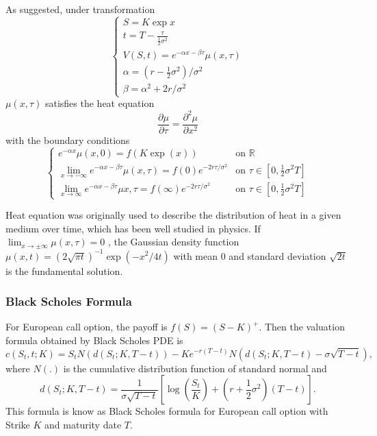 \documentclass[11pt]{book}
\def\bR{{\mathbb{R}}}
\begin{document}
As suggested, under transformation
\begin{equation}
\begin{cases}
S=K\exp{x} \\
t=T-\frac{\tau}{\frac{1}{2}\sigma ^2} \\
V(S,t)=e^{-\alpha x - \beta \tau } \mu(x, \tau)\\
\alpha=(r-\frac{1}{2} \sigma ^2) / \sigma ^2 \\
\beta= \alpha ^2 + 2r/{\sigma}^2
\end{cases}
\end{equation}
$\mu(x,\tau)$ satisfies the heat equation
\begin{equation}
\frac{\partial \mu}{\partial \tau} = \frac{\partial ^2 \mu}{\partial x^2}
\end{equation}
with the boundary conditions
\begin{equation}
\begin{cases}
e^{-\alpha x} \mu (x,0) = f(K \exp(x)) & \text{on } \bR \\
\displaystyle \lim_{x \to -\infty}e^{-\alpha x- \beta \tau } \mu(x,\tau) = f(0)e^{-2r\tau / \sigma ^2} &\text{on } \tau \in [0,\frac{1}{2}\sigma ^2 T] \\
\displaystyle \lim_{x \to \infty} e^{-\alpha x -\beta \tau } \mu{x,\tau}  = f(\infty) e^{-2r\tau / \sigma ^2} & \text{on } \tau \in [0, \frac{1}{2} \sigma ^2 T]
\end{cases}
\end{equation}

Heat equation was originally used to describe the distribution of heat in a given medium over time, which has been well studied in physics. If $\lim_{x\to \pm \infty} \mu (x, \tau)= 0$ , the Gaussian density function $\mu (x,t) = (2 \sqrt{\pi t} )^{-1} \exp(-x^2 /{4t})$ with mean $0$ and standard deviation $\sqrt {2t} $ is the fundamental solution.

\subsubsection{Black Scholes Formula}
For European call option, the payoff is $f(S)=(S-K)^+$. Then the valuation formula obtained by Black Scholes PDE is
\begin{equation}
c(S_t,t;K)=S_t N(d(S_t;K,T-t))-Ke^{-r(T-t)}N(d(S_t;K,T-t)-\sigma\sqrt{T-t}),
\end{equation}
where $N(.)$ is the cumulative distribution function of standard normal and
\begin{equation}
d(S_t;K,T-t)=\frac{1}{\sigma \sqrt{T-t}} [\log(\frac{S_t}{K}) + (r+\frac{1}{2}\sigma ^2)(T-t)].
\end{equation}
This formula is know as Black Scholes formula for European call option with Strike $K$ and maturity date $T$.
\end{document}
